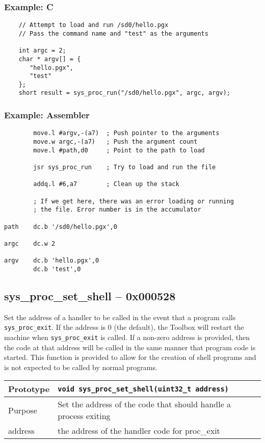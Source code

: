 \subsubsection*{Example: C}
\begin{lstlisting}
    // Attempt to load and run /sd0/hello.pgx
    // Pass the command name and "test" as the arguments

    int argc = 2;
    char * argv[] = {
       "hello.pgx",
       "test"
    };
    short result = sys_proc_run("/sd0/hello.pgx", argc, argv);
\end{lstlisting}

\subsubsection*{Example: Assembler}
\begin{verbatim}
        move.l #argv,-(a7)  ; Push pointer to the arguments
        move.w argc,-(a7)   ; Push the argument count
        move.l #path,d0     ; Point to the path to load
    
        jsr sys_proc_run    ; Try to load and run the file

        addq.l #6,a7        ; Clean up the stack

        ; If we get here, there was an error loading or running
        ; the file. Error number is in the accumulator
    
path    dc.b '/sd0/hello.pgx',0

argc    dc.w 2

argv    dc.b 'hello.pgx',0
        dc.b 'test',0
\end{verbatim}

\subsection*{sys\_proc\_set\_shell -- 0x000528}
Set the address of a handler to be called in the event that a program calls \lstinline|sys_proc_exit|.
If the address is 0 (the default), the Toolbox will restart the machine when \lstinline|sys_proc_exit| is called.
If a non-zero address is provided, then the code at that address will be called in the same manner that program code
is started.
This function is provided to allow for the creation of shell programs and is not expected to be called by normal programs.

\bigskip

\begin{table}[!h]\begin{tabular}{|l||l|} \hline
Prototype & \lstinline!void sys_proc_set_shell(uint32_t address)! \\ \hline
Purpose & Set the address of the code that should handle a process exiting \\ \hline
address & the address of the handler code for proc\_exit \\ \hline
\end{tabular}\end{table}


